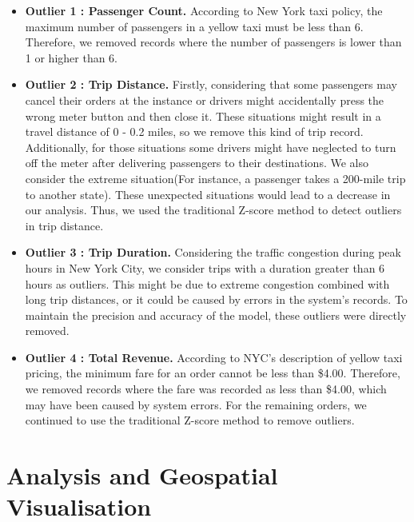 \documentclass[11pt]{article}
\begin{document}
\begin{itemize}
    \item \textbf{Outlier 1 : Passenger Count.} According to New York taxi policy, the maximum number of passengers in a yellow taxi must be less than 6. Therefore, we removed records where the number of passengers is lower than 1 or higher than 6.
    
    \item \textbf{Outlier 2 : Trip Distance. } Firstly, considering that some passengers may cancel their orders at the instance or drivers might accidentally press the wrong meter button and then close it. These situations might result in a travel distance of 0 - 0.2 miles, so we remove this kind of trip record. Additionally, for those situations some drivers might have neglected to turn off the meter after delivering passengers to their destinations. We also consider the extreme situation(For instance, a passenger takes a 200-mile trip to another state). These unexpected situations would lead to a decrease in our analysis. Thus, we used the traditional Z-score method to detect outliers in trip distance.
    
    \item \textbf{Outlier 3 : Trip Duration.} Considering the traffic congestion during peak hours in New York City, we consider trips with a duration greater than 6 hours as outliers. This might be due to extreme congestion combined with long trip distances, or it could be caused by errors in the system's records. To maintain the precision and accuracy of the model, these outliers were directly removed.

    \item \textbf{Outlier 4 : Total Revenue.} According to NYC's description of yellow taxi pricing, the minimum fare for an order cannot be less than \$4.00. Therefore, we removed records where the fare was recorded as less than \$4.00, which may have been caused by system errors. For the remaining orders, we continued to use the traditional Z-score method to remove outliers.
\end{itemize}


\section{Analysis and Geospatial Visualisation}
\end{document}
